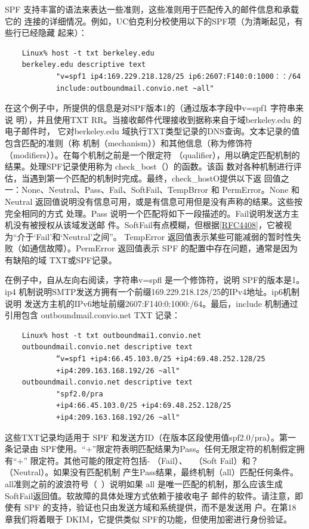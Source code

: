 SPF 支持丰富的语法来表达一些准则，这些准则用于匹配传入的邮件信息和承载它的
连接的详细情况。例如，UC伯克利分校使用以下的SPF项（为清晰起见，有些行已经隐藏
起来）：

\begin{verbatim}
    Linux% host -t txt berkeley.edu
    berkeley.edu descriptive text
            "v=spf1 ip4:169.229.218.128/25 ip6:2607:F140:0:1000：：/64
            include:outboundmail.convio.net ~all"
\end{verbatim}

在这个例子中，所提供的信息是对SPF版本1的（通过版本字段中v=spf1 字符串来说
明），并且使用TXT RR。当接收邮件代理接收到据称来自于域berkeley.edu 的电子邮件时，
它对berkeley.edu 域执行TXT类型记录的DNS查询。文本记录的值包含匹配的准则（称
机制（mechanism））和其他信息（称为修饰符（modifiers））。在每个机制之前是一个限定符
（qualifier），用以确定匹配机制的结果。处理SPF记录使用称为 check\_bost（）的函数。该函
数对各种机制进行评估，当遇到第一个匹配的机制时完成。最终，check\_hostO提供以下返
回值之一：None、Neutral、Pass、Fail、SoftFail、TempBrror 和 PermError。None 和 Neutral
返回值说明没有信息可用，或是有信息可用但是没有声称的结果。这些按完全相同的方式
处理。Pass 说明一个匹配将如下一段描述的。Fail说明发送方主机没有被授权从该域发送邮
件。SoftFail有点模糊，但根据\href{https://www.rfc-editor.org/rfc/rfc4408}{[RFC4408]}，它被视为“介于‘Fail’和‘Neutral’之间”。
TempError 返回值表示某些可能减弱的暂时性失败（如通信故障）。PermError 返回值表示
SPF 的配置中存在问题，通常是因为有缺陷的域 TXT或SPF记录。

在例子中，自从左向右阅读，字符串v=spfl 是一个修饰符，说明 SPF的版本是1。ip4
机制说明SMTP发送方拥有一个前缀169.229.218.128/25的IPv4地址。ip6机制说明
发送方主机的IPv6地址前缀2607:F140:0:1000:/64。最后，include 机制通过引用包含
outboundmail.convio.net TXT 记录：

\begin{verbatim}
    Linux% host -t txt outboundmai1.convio.net
    outboundmail.convio.net descriptive text
            “v=spf1 +ip4:66.45.103.0/25 +ip4:69.48.252.128/25
            +ip4:209.163.168.192/26 ~all"
    outboundmail.convio.net descriptive text
            "spf2.0/pra
            +ip4:66.45.103.0/25 +ip4:69.48.252.128/25
            +ip4:209.163.168.192/26 ~all"
\end{verbatim}

\begin{tcolorbox}
    这些TXT记录均适用于 SPF 和发送方ID（在版本区段使用值spf2.0/pra）。第一
    条记录由 SPF使用。“+”限定符表明匹配结果为Pass。任何无限定符的机制假定拥有“+”
    限定符。其他可能的限定符包括- （Fail）、~ （Soft Fail）和？（Neutral）。如果没有匹配机制
    产生Pass结果，最终机制（all）匹配任何条件。all准则之前的波浪符号（~）说明如果 all
    是唯一匹配的机制，那么应该生成SoftFail返回值。软故障的具体处理方式依赖于接收电子
    邮件的软件。请注意，即使有 SPF 的支持，验证也只由发送方域和系统提供，而不是发送用
    户。在第18 章我们将着眼于 DKIM，它提供类似 SPF的功能，但使用加密进行身份验证。
\end{tcolorbox}

